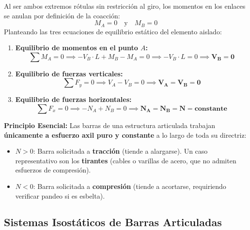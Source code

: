 Al ser ambos extremos rótulas sin restricción al giro, los momentos en los enlaces se anulan por definición de la coacción:
\begin{equation}
    M_A = 0 \quad \text{y} \quad M_B = 0
\end{equation}
Planteando las tres ecuaciones de equilibrio estático del elemento aislado:
\begin{enumerate}
    \item \textbf{Equilibrio de momentos en el punto $A$:}
          \begin{equation}
              \sum M_A = 0 \implies -V_B \cdot L + M_B - M_A = 0 \implies -V_B \cdot L = 0 \implies \mathbf{V_B = 0}
          \end{equation}
    \item \textbf{Equilibrio de fuerzas verticales:}
          \begin{equation}
              \sum F_y = 0 \implies V_A - V_B = 0 \implies \mathbf{V_A = V_B = 0}
          \end{equation}
    \item \textbf{Equilibrio de fuerzas horizontales:}
          \begin{equation}
              \sum F_x = 0 \implies -N_A + N_B = 0 \implies \mathbf{N_A = N_B = N = \text{constante}}
          \end{equation}
\end{enumerate}

\begin{tcolorbox}[colback=green!5!white, colframe=green!60!black, arc=3pt, boxrule=0.8pt]
    \textbf{Principio Esencial:} Las barras de una estructura articulada trabajan \textbf{únicamente a esfuerzo axil puro y constante} a lo largo de toda su directriz:
    \begin{itemize}
        \item $N > 0$: Barra solicitada a \textbf{tracción} (tiende a alargarse). Un caso representativo son los \textbf{tirantes} (cables o varillas de acero, que no admiten esfuerzos de compresión).
        \item $N < 0$: Barra solicitada a \textbf{compresión} (tiende a acortarse, requiriendo verificar pandeo si es esbelta).
    \end{itemize}
\end{tcolorbox}

\subsection{Sistemas Isostáticos de Barras Articuladas}

